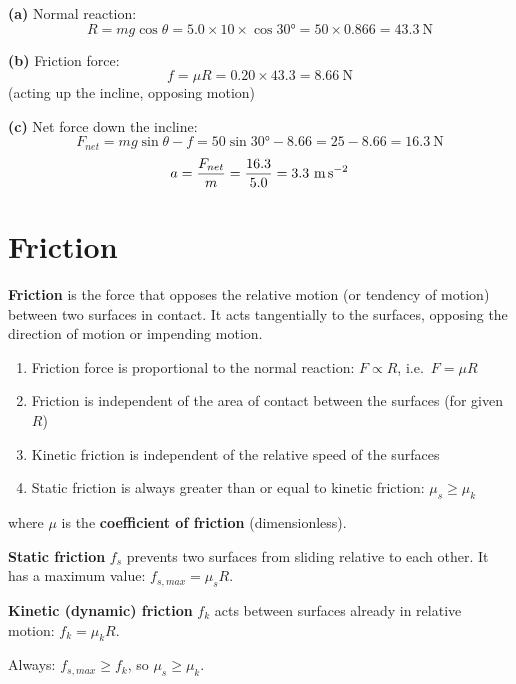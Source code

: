 \begin{solutionbox}
\textbf{(a)} Normal reaction:
\[
  R = mg\cos\theta = 5.0 \times 10 \times \cos 30°
  = 50 \times 0.866 = 43.3\ \text{N}
\]

\textbf{(b)} Friction force:
\[
  f = \mu R = 0.20 \times 43.3 = 8.66\ \text{N}
\]
(acting up the incline, opposing motion)

\textbf{(c)} Net force down the incline:
\[
  F_{net} = mg\sin\theta - f
  = 50\sin 30° - 8.66
  = 25 - 8.66 = 16.3\ \text{N}
\]
\[
  a = \frac{F_{net}}{m} = \frac{16.3}{5.0}
  = 3.3\ \text{m\,s}^{-2}
\]
\end{solutionbox}

\section{Friction}

\begin{definitionbox}[Friction]
\textbf{Friction} is the force that opposes the relative
motion (or tendency of motion) between two surfaces in
contact. It acts tangentially to the surfaces, opposing
the direction of motion or impending motion.
\end{definitionbox}

\begin{lawbox}
\begin{enumerate}[noitemsep]
  \item Friction force is proportional to the normal
  reaction: $F \propto R$, i.e.\ $F = \mu R$
  \item Friction is independent of the area of contact
  between the surfaces (for given $R$)
  \item Kinetic friction is independent of the relative
  speed of the surfaces
  \item Static friction is always greater than or equal
  to kinetic friction:
  $\mu_s \geq \mu_k$
\end{enumerate}
where $\mu$ is the \textbf{coefficient of friction}
(dimensionless).
\end{lawbox}

\begin{definitionbox}
\textbf{Static friction} $f_s$ prevents two surfaces
from sliding relative to each other. It has a maximum
value: $f_{s,max} = \mu_s R$.

\textbf{Kinetic (dynamic) friction} $f_k$ acts between
surfaces already in relative motion: $f_k = \mu_k R$.

Always: $f_{s,max} \geq f_k$, so $\mu_s \geq \mu_k$.
\end{definitionbox}

